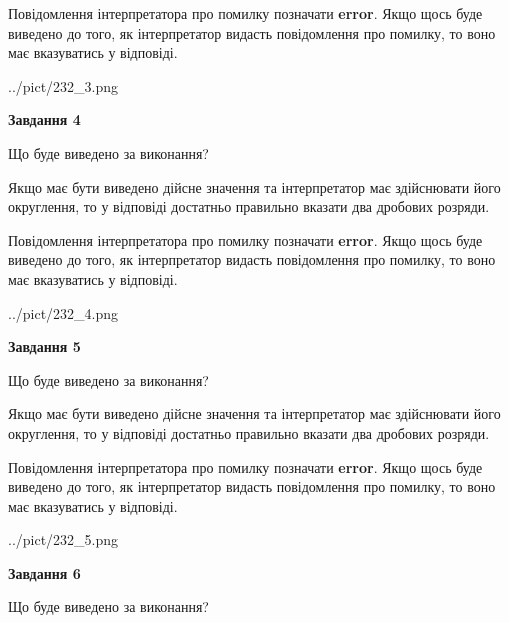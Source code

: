 \documentclass[12pt, ukrainian]{article}
\begin{document}
{\begin {Large}
Повідомлення інтерпретатора про помилку позначати \textbf{error}.
Якщо щось буде виведено до того, як інтерпретатор видасть повідомлення про помилку, 
то воно має вказуватись у відповіді. \par

\begin{center}
	{../pict/232_3.png}
\end{center}
\newpage

{\begin {center}\textbf{Завдання 4}\end {center}}\par
Що буде виведено за виконання? \par

Якщо має бути виведено дійсне значення та інтерпретатор має здійснювати його округлення, 
то у відповіді достатньо правильно вказати два дробових розряди.

Повідомлення інтерпретатора про помилку позначати \textbf{error}.
Якщо щось буде виведено до того, як інтерпретатор видасть повідомлення про помилку, 
то воно має вказуватись у відповіді. \par

\begin{center}
	{../pict/232_4.png}
\end{center}
\newpage

{\begin {center}\textbf{Завдання 5}\end {center}}\par
Що буде виведено за виконання? \par

Якщо має бути виведено дійсне значення та інтерпретатор має здійснювати його округлення, 
то у відповіді достатньо правильно вказати два дробових розряди.

Повідомлення інтерпретатора про помилку позначати \textbf{error}.
Якщо щось буде виведено до того, як інтерпретатор видасть повідомлення про помилку, 
то воно має вказуватись у відповіді. \par

\begin{center}
	{../pict/232_5.png}
\end{center}
\newpage

{\begin {center}\textbf{Завдання 6}\end {center}}\par
Що буде виведено за виконання? \par


\end{Large}}
\end{document}
